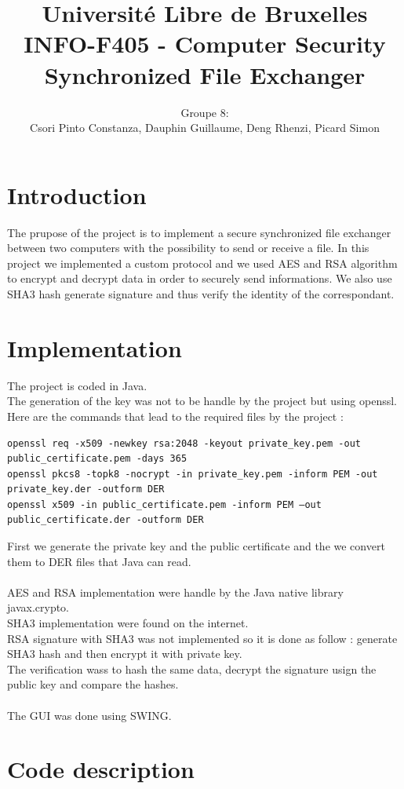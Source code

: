 \documentclass[a4paper,12pt]{article}
\title{Université Libre de Bruxelles \\
INFO-F405 - Computer Security \\
Synchronized File Exchanger}
\author{Groupe 8: \\
Csori Pinto Constanza, Dauphin Guillaume, Deng Rhenzi, Picard Simon}
\begin{document}
\maketitle
\clearpage
\tableofcontents
\clearpage

\section{Introduction}
The prupose of the project is to implement a secure synchronized file exchanger between two computers with the possibility to send or receive a file. In this project we implemented a custom protocol and we used AES and RSA algorithm to encrypt and decrypt data in order to securely send informations. We also use SHA3 hash generate signature and thus verify the identity of the correspondant.


\section{Implementation}
The project is coded in Java.\\
The generation of the key was not to be handle by the project but using openssl.\\
Here are the commands that lead to the required files by the project :
\begin{verbatim}
openssl req -x509 -newkey rsa:2048 -keyout private_key.pem -out public_certificate.pem -days 365
openssl pkcs8 -topk8 -nocrypt -in private_key.pem -inform PEM -out private_key.der -outform DER
openssl x509 -in public_certificate.pem -inform PEM –out public_certificate.der -outform DER
\end{verbatim}
First we generate the private key and the public certificate and the we convert them to DER files that Java can read.\\
\\
AES and RSA implementation were handle by the Java native library javax.crypto.\\
SHA3 implementation were found on the internet.\\
RSA signature with SHA3 was not implemented so it is done as follow : generate SHA3 hash and then encrypt it with private key.\\
The verification wass to hash the same data, decrypt the signature usign the public key and compare the hashes.\\
\\
The GUI was done using SWING.

\section{Code description}
\end{document}
